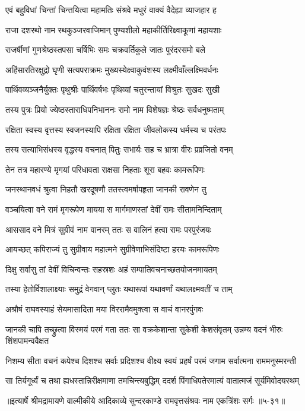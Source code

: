 
\twolineshloka
{एवं बहुविधां चिन्तां चिन्तयित्वा महामतिः}
{संश्रवे मधुरं वाक्यं वैदेह्या व्याजहार ह} %

\twolineshloka
{राजा दशरथो नाम रथकुञ्जरवाजिमान्}
{पुण्यशीलो महाकीर्तिरिक्ष्वाकूणां महायशाः} %

\twolineshloka
{राजर्षीणां गुणश्रेष्ठस्तपसा चर्षिभिः समः}
{चक्रवर्तिकुले जातः पुरंदरसमो बले} %

\twolineshloka
{अहिंसारतिरक्षुद्रो घृणी सत्यपराक्रमः}
{मुख्यस्येक्ष्वाकुवंशस्य लक्ष्मीवाँल्लक्ष्मिवर्धनः} %

\twolineshloka
{पार्थिवव्यञ्जनैर्युक्तः पृथुश्रीः पार्थिवर्षभः}
{पृथिव्यां चतुरन्तायां विश्रुतः सुखदः सुखी} %

\twolineshloka
{तस्य पुत्रः प्रियो ज्येष्ठस्ताराधिपनिभाननः}
{रामो नाम विशेषज्ञः श्रेष्ठः सर्वधनुष्मताम्} %

\twolineshloka
{रक्षिता स्वस्य वृत्तस्य स्वजनस्यापि रक्षिता}
{रक्षिता जीवलोकस्य धर्मस्य च परंतपः} %

\twolineshloka
{तस्य सत्याभिसंधस्य वृद्धस्य वचनात् पितुः}
{सभार्यः सह च भ्रात्रा वीरः प्रव्रजितो वनम्} %

\twolineshloka
{तेन तत्र महारण्ये मृगयां परिधावता}
{राक्षसा निहताः शूरा बहवः कामरूपिणः} %

\twolineshloka
{जनस्थानवधं श्रुत्वा निहतौ खरदूषणौ}
{ततस्त्वमर्षापहृता जानकी रावणेन तु} %

\twolineshloka
{वञ्चयित्वा वने रामं मृगरूपेण मायया}
{स मार्गमाणस्तां देवीं रामः सीतामनिन्दिताम्} %

\twolineshloka
{आससाद वने मित्रं सुग्रीवं नाम वानरम्}
{ततः स वालिनं हत्वा रामः परपुरंजयः} %

\twolineshloka
{आयच्छत् कपिराज्यं तु सुग्रीवाय महात्मने}
{सुग्रीवेणाभिसंदिष्टा हरयः कामरूपिणः} %

\twolineshloka
{दिक्षु सर्वासु तां देवीं विचिन्वन्तः सहस्रशः}
{अहं सम्पातिवचनाच्छतयोजनमायतम्} %

\twolineshloka
{तस्या हेतोर्विशालाक्ष्याः समुद्रं वेगवान् प्लुतः}
{यथारूपां यथावर्णां यथालक्ष्मवतीं च ताम्} %

\twolineshloka
{अश्रौषं राघवस्याहं सेयमासादिता मया}
{विररामैवमुक्त्वा स वाचं वानरपुंगवः} %

\threelineshloka
{जानकी चापि तच्छ्रुत्वा विस्मयं परमं गता}
{ततः सा वक्रकेशान्ता सुकेशी केशसंवृतम्}
{उन्नम्य वदनं भीरुः शिंशपामन्ववैक्षत} %

\twolineshloka
{निशम्य सीता वचनं कपेश्च दिशश्च सर्वाः प्रदिशश्च वीक्ष्य}
{स्वयं प्रहर्षं परमं जगाम सर्वात्मना राममनुस्मरन्ती} %

\twolineshloka
{सा तिर्यगूर्ध्वं च तथा ह्यधस्तान्निरीक्षमाणा तमचिन्त्यबुद्धिम्}
{ददर्श पिंगाधिपतेरमात्यं वातात्मजं सूर्यमिवोदयस्थम्} %


॥इत्यार्षे श्रीमद्रामायणे वाल्मीकीये आदिकाव्ये सुन्दरकाण्डे रामवृत्तसंश्रवः नाम एकत्रिंशः सर्गः ॥५-३१॥
